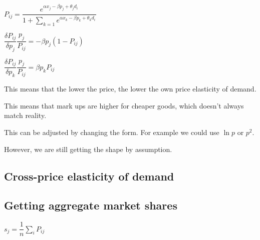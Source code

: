 \(P_{ij}=\dfrac{e^{\alpha x_j -\beta p_j + \theta_j d_i}}{1+\sum_{k=1} e^{ \alpha x_k -\beta p_k +\theta_k d_i}}\)

\(\dfrac{\delta P_{ij} }{\delta p_j}\dfrac{p_j}{P_{ij}}=-\beta p_j(1-P_{ij})\)

\(\dfrac{\delta P_{ij} }{\delta p_k}\dfrac{p_j}{P_{ij}}=\beta p_kP_{ij}\)

This means that the lower the price, the lower the own price elasticity of demand.

This means that mark ups are higher for cheaper goods, which doesn't always match reality.

This can be adjusted by changing the form. For example we could use \(\ln p\) or \(p^2\).

However, we are still getting the shape by assumption.

\subsection{Cross-price elasticity of demand}

\subsection{Getting aggregate market shares}

\(s_j = \dfrac{1}{n}\sum_i P_{ij}\)

